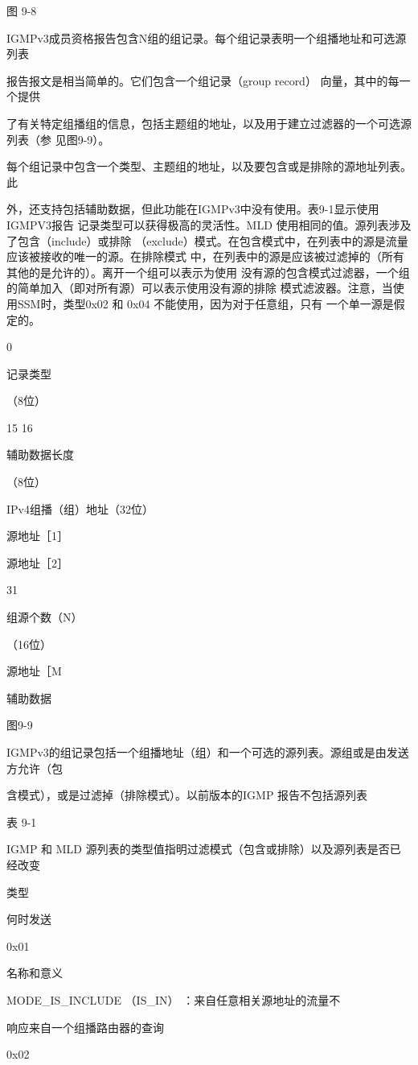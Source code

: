 图 9-8

IGMPv3成员资格报告包含N组的组记录。每个组记录表明一个组播地址和可选源列表

报告报文是相当简单的。它们包含一个组记录（group record） 向量，其中的每一个提供

了有关特定组播组的信息，包括主题组的地址，以及用于建立过滤器的一个可选源列表（参
见图9-9）。

每个组记录中包含一个类型、主题组的地址，以及要包含或是排除的源地址列表。此

外，还支持包括辅助数据，但此功能在IGMPv3中没有使用。表9-1显示使用IGMPV3报告
记录类型可以获得极高的灵活性。MLD 使用相同的值。源列表涉及了包含（include）或排除
（exclude）模式。在包含模式中，在列表中的源是流量应该被接收的唯一的源。在排除模式
中，在列表中的源是应该被过滤掉的（所有其他的是允许的）。离开一个组可以表示为使用
没有源的包含模式过滤器，一个组的简单加入（即对所有源）可以表示使用没有源的排除
模式滤波器。注意，当使用SSM时，类型0x02 和 0x04 不能使用，因为对于任意组，只有
一个单一源是假定的。

0

记录类型

（8位）

15 16

辅助数据长度

（8位）

IPv4组播（组）地址（32位）

源地址［1］

源地址［2］

31

组源个数（N）

（16位）

源地址［M

辅助数据

图9-9

IGMPv3的组记录包括一个组播地址（组）和一个可选的源列表。源组或是由发送方允许（包

含模式），或是过滤掉（排除模式）。以前版本的IGMP 报告不包括源列表

表 9-1

IGMP 和 MLD 源列表的类型值指明过滤模式（包含或排除）以及源列表是否已经改变

类型

何时发送

0x01

名称和意义

MODE\_IS\_INCLUDE （IS\_IN） ：来自任意相关源地址的流量不

响应来自一个组播路由器的查询

0x02

